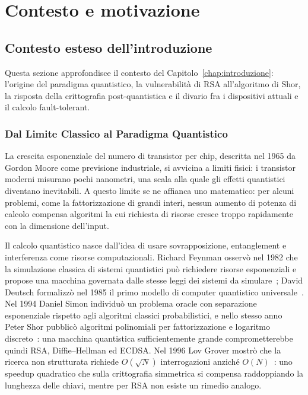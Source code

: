 \chapter{Contesto e motivazione}
\captionsetup[figure]{font=small,labelfont=bf}
\label{app:contesto}

\section{Contesto esteso dell'introduzione}
\label{app:introduzione}
\begin{onehalfspace}

Questa sezione approfondisce il contesto del Capitolo~\ref{chap:introduzione}: l'origine del paradigma quantistico, la vulnerabilità di RSA all'algoritmo di Shor, la risposta della crittografia post-quantistica e il divario fra i dispositivi attuali e il calcolo fault-tolerant.

\subsection{Dal Limite Classico al Paradigma Quantistico}
\label{app:intro:origini}
\label{app:intro:algoritmi}

La crescita esponenziale del numero di transistor per chip, descritta nel 1965 da Gordon Moore come previsione industriale, si avvicina a limiti fisici: i transistor moderni misurano pochi nanometri, una scala alla quale gli effetti quantistici diventano inevitabili. A questo limite se ne affianca uno matematico: per alcuni problemi, come la fattorizzazione di grandi interi, nessun aumento di potenza di calcolo compensa algoritmi la cui richiesta di risorse cresce troppo rapidamente con la dimensione dell'input.

Il calcolo quantistico nasce dall'idea di usare sovrapposizione, entanglement e interferenza come risorse computazionali. Richard Feynman osservò nel 1982 che la simulazione classica di sistemi quantistici può richiedere risorse esponenziali e propose una macchina governata dalle stesse leggi dei sistemi da simulare~\cite{feynman1982}; David Deutsch formalizzò nel 1985 il primo modello di computer quantistico universale~\cite{deutsch1985}. Nel 1994 Daniel Simon individuò un problema oracle con separazione esponenziale rispetto agli algoritmi classici probabilistici, e nello stesso anno Peter Shor pubblicò algoritmi polinomiali per fattorizzazione e logaritmo discreto~\cite{shor1994}: una macchina quantistica sufficientemente grande comprometterebbe quindi RSA, Diffie--Hellman ed \ac{ECDSA}. Nel 1996 Lov Grover mostrò che la ricerca non strutturata richiede $O(\sqrt{N})$ interrogazioni anziché $O(N)$~\cite{grover1996}: uno speedup quadratico che sulla crittografia simmetrica si compensa raddoppiando la lunghezza delle chiavi, mentre per RSA non esiste un rimedio analogo.


\end{onehalfspace}
